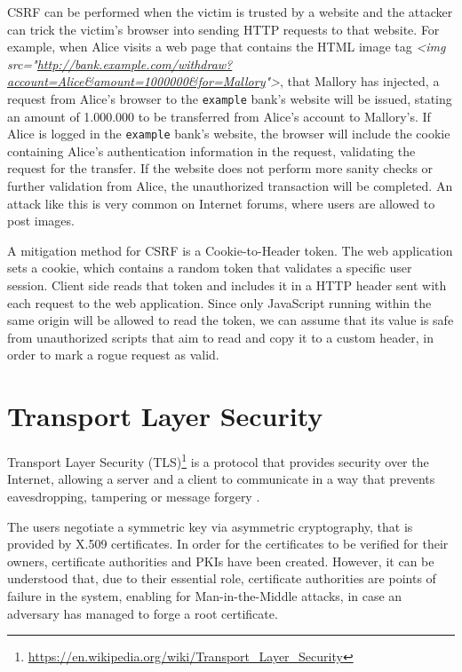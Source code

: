 CSRF can be performed when the victim is trusted by a website and the attacker
can trick the victim's browser into sending HTTP requests to that website. For
example, when Alice visits a web page that contains the HTML image tag
\textit{<img
src="\url{http://bank.example.com/withdraw?account=Alice&amount=1000000&for=Mallory}">},
that Mallory has injected, a request from Alice's browser to the
\texttt{example} bank's website will be issued, stating an amount of
1.000.000 to be transferred from Alice's account to Mallory's. If Alice is
logged in the \texttt{example} bank's website, the browser will include the
cookie containing Alice's authentication information in the request, validating
the request for the transfer. If the website does not perform more sanity checks
or further validation from Alice, the unauthorized transaction will be
completed. An attack like this is very common on Internet forums, where users
are allowed to post images.

A mitigation method for CSRF is a Cookie-to-Header token. The web application
sets a cookie, which contains a random token that validates a specific user
session. Client side reads that token and includes it in a HTTP header sent with
each request to the web application. Since only JavaScript running within the
same origin will be allowed to read the token, we can assume that its value is
safe from unauthorized scripts that aim to read and copy it to a custom header,
in order to mark a rogue request as valid.

\section{Transport Layer Security}\label{sec:tls}

Transport Layer Security
(TLS)\footnote{\url{https://en.wikipedia.org/wiki/Transport_Layer_Security}} is
a protocol that provides security over the Internet, allowing a server and a
client to communicate in a way that prevents eavesdropping, tampering or message
forgery \cite{tls12}.

The users negotiate a symmetric key via asymmetric cryptography, that is
provided by X.509 certificates. In order for the certificates to be verified for
their owners, certificate authorities and PKIs have been created. However, it
can be understood that, due to their essential role, certificate authorities are
points of failure in the system, enabling for Man-in-the-Middle attacks, in case
an adversary has managed to forge a root certificate.


